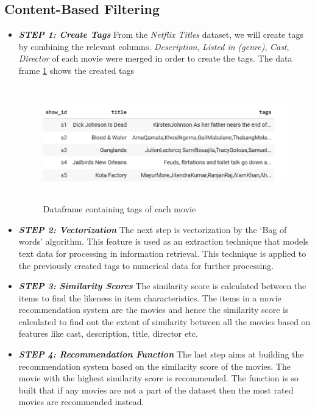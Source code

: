 \documentclass[a4paper,10pt]{article}
\begin{document}
\subsection{Content-Based Filtering}
\begin{itemize}
    \item  \textbf{\textit{STEP 1: Create Tags}} 
    From the \textit{Netflix Titles} dataset, we will  create tags by combining the relevant columns. \textit{Description}, \textit{Listed in (genre)}, \textit{Cast}, \textit{Director} of each movie were merged in order to create the tags. The data frame \ref{tags} shows the created tags


\begin{figure}[H]
        
        \centering
        \includegraphics[height=5cm]{figures/tags.png}
        \caption{Dataframe containing tags of each movie}
        \label{tags}
\end{figure}

    \item  \textbf{\textit{STEP 2: Vectorization}}
    The next step is vectorization by the ‘Bag of words’ algorithm. This feature is used as an extraction technique that models text data for processing in information retrieval. This technique is applied to the previously created tags to numerical data for further processing.

    \item  \textbf{\textit{STEP 3: Similarity Scores}}
    The similarity score is calculated between the items to find the likeness in item characteristics. The items in a movie recommendation system are the movies and hence the similarity score is calculated to find out the extent of similarity between all the movies based on features like cast, description, title, director etc.

    \item  \textbf{\textit{STEP 4: Recommendation Function}}
    The last step aims at building the recommendation system based on the similarity score of the movies. The movie with the highest similarity score is recommended. The function is so built that if any movies are not a part of the dataset then the most rated movies are recommended instead.


\end{itemize}
\end{document}

